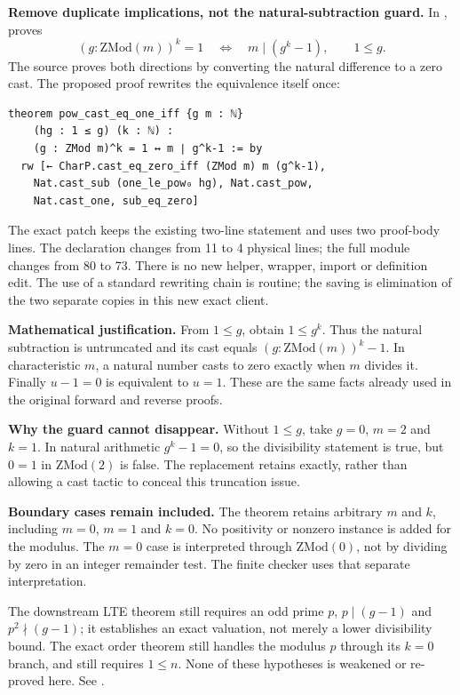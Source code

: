 \textbf{Remove duplicate implications, not the natural-subtraction guard.}
In ,  proves
\[
 (g:\mathrm{ZMod}(m))^k=1
 \quad\Longleftrightarrow\quad m\mid(g^k-1),
 \qquad 1\le g.
\]
The source proves both directions by converting the natural difference to a zero cast. The proposed proof rewrites the equivalence itself once:

\begin{lstlisting}
theorem pow_cast_eq_one_iff {g m : ℕ}
    (hg : 1 ≤ g) (k : ℕ) :
    (g : ZMod m)^k = 1 ↔ m ∣ g^k-1 := by
  rw [← CharP.cast_eq_zero_iff (ZMod m) m (g^k-1),
    Nat.cast_sub (one_le_pow₀ hg), Nat.cast_pow,
    Nat.cast_one, sub_eq_zero]
\end{lstlisting}

The exact patch keeps the existing two-line statement and uses two proof-body lines. The declaration changes from 11 to 4 physical lines; the full module changes from 80 to 73. There is no new helper, wrapper, import or definition edit. The use of a standard rewriting chain is routine; the saving is elimination of the two separate copies in this new exact client.

\textbf{Mathematical justification.} From $1\le g$, obtain $1\le g^k$. Thus the natural subtraction is untruncated and its cast equals
$(g:\mathrm{ZMod}(m))^k-1$. In characteristic $m$, a natural number casts to zero exactly when $m$ divides it. Finally $u-1=0$ is equivalent to $u=1$. These are the same facts already used in the original forward and reverse proofs.

\textbf{Why the guard cannot disappear.} Without $1\le g$, take $g=0$, $m=2$ and $k=1$. In natural arithmetic $g^k-1=0$, so the divisibility statement is true, but $0=1$ in $\mathrm{ZMod}(2)$ is false. The replacement retains  exactly, rather than allowing a cast tactic to conceal this truncation issue.

\textbf{Boundary cases remain included.} The theorem retains arbitrary $m$ and $k$, including $m=0$, $m=1$ and $k=0$. No positivity or nonzero instance is added for the modulus. The $m=0$ case is interpreted through $\mathrm{ZMod}(0)$, not by dividing by zero in an integer remainder test. The finite checker uses that separate interpretation.

The downstream LTE theorem still requires an odd prime $p$, $p\mid(g-1)$ and $p^2\nmid(g-1)$; it establishes an exact valuation, not merely a lower divisibility bound. The exact order theorem still handles the modulus $p$ through its $k=0$ branch, and  still requires $1\le n$. None of these hypotheses is weakened or re-proved here. See .

